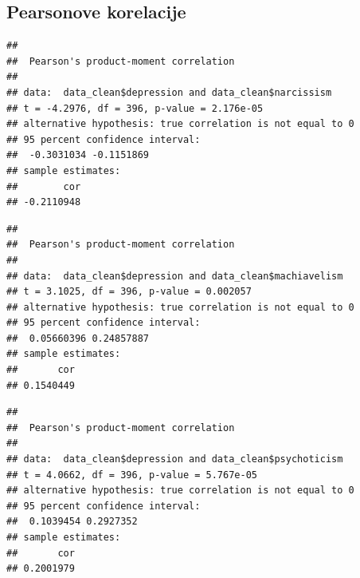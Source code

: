 \documentclass[
]{article}
\newenvironment{Shaded}{\begin{snugshade}}{\end{snugshade}}
\newcommand{\FunctionTok}[1]{\textcolor[rgb]{0.13,0.29,0.53}{\textbf{#1}}}
\newcommand{\NormalTok}[1]{#1}
\newcommand{\SpecialCharTok}[1]{\textcolor[rgb]{0.81,0.36,0.00}{\textbf{#1}}}
\begin{document}
\subsection{Pearsonove korelacije}\label{pearsonove-korelacije}

\begin{Shaded}
\end{Shaded}

\begin{verbatim}
## 
##  Pearson's product-moment correlation
## 
## data:  data_clean$depression and data_clean$narcissism
## t = -4.2976, df = 396, p-value = 2.176e-05
## alternative hypothesis: true correlation is not equal to 0
## 95 percent confidence interval:
##  -0.3031034 -0.1151869
## sample estimates:
##        cor 
## -0.2110948
\end{verbatim}

\begin{Shaded}
\end{Shaded}

\begin{verbatim}
## 
##  Pearson's product-moment correlation
## 
## data:  data_clean$depression and data_clean$machiavelism
## t = 3.1025, df = 396, p-value = 0.002057
## alternative hypothesis: true correlation is not equal to 0
## 95 percent confidence interval:
##  0.05660396 0.24857887
## sample estimates:
##       cor 
## 0.1540449
\end{verbatim}

\begin{Shaded}
\end{Shaded}

\begin{verbatim}
## 
##  Pearson's product-moment correlation
## 
## data:  data_clean$depression and data_clean$psychoticism
## t = 4.0662, df = 396, p-value = 5.767e-05
## alternative hypothesis: true correlation is not equal to 0
## 95 percent confidence interval:
##  0.1039454 0.2927352
## sample estimates:
##       cor 
## 0.2001979
\end{verbatim}
\end{document}
